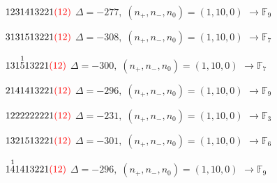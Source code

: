 \documentclass[10pt]{article}
\begin{document}
\smallskip

$1231413221\textcolor{red}{(12)}$ \quad $\Delta=-277,\; (n_+,n_-,n_0)=(1,10,0)$ \quad $\to \mathbb{F}_{9}$

\smallskip

$3131513221\textcolor{red}{(12)}$ \quad $\Delta=-308,\; (n_+,n_-,n_0)=(1,10,0)$ \quad $\to \mathbb{F}_{7}$

\smallskip

$131\overset{1}{5}13221\textcolor{red}{(12)}$ \quad $\Delta=-300,\; (n_+,n_-,n_0)=(1,10,0)$ \quad $\to \mathbb{F}_{7}$

\smallskip

$2141413221\textcolor{red}{(12)}$ \quad $\Delta=-296,\; (n_+,n_-,n_0)=(1,10,0)$ \quad $\to \mathbb{F}_{9}$

\smallskip

$1222222221\textcolor{red}{(12)}$ \quad $\Delta=-231,\; (n_+,n_-,n_0)=(1,10,0)$ \quad $\to \mathbb{F}_{3}$

\smallskip

$1321513221\textcolor{red}{(12)}$ \quad $\Delta=-301,\; (n_+,n_-,n_0)=(1,10,0)$ \quad $\to \mathbb{F}_{6}$

\smallskip

$1\overset{1}{4}1413221\textcolor{red}{(12)}$ \quad $\Delta=-296,\; (n_+,n_-,n_0)=(1,10,0)$ \quad $\to \mathbb{F}_{9}$
\end{document}
